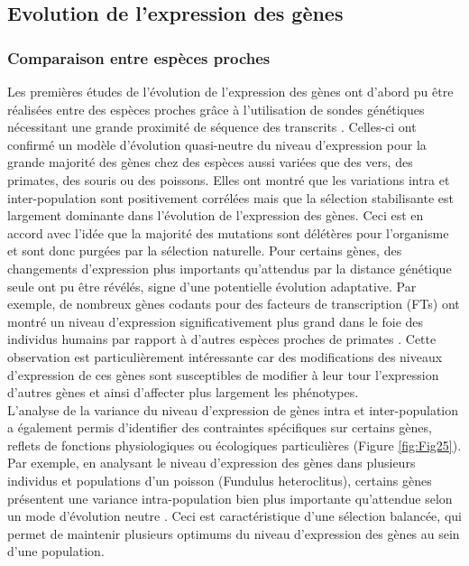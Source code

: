 \subsection{Evolution de l’expression des gènes}
\label{subsec:evol-expr}

\subsubsection{Comparaison entre espèces proches}
\label{subsec:comp-sp-proche}

Les premières études de l’évolution de l’expression des gènes ont d’abord pu être réalisées entre des espèces proches grâce à l’utilisation de sondes génétiques nécessitant une grande proximité de séquence des transcrits \citep{enard_intra-_2002,oleksiak_variation_2002,denver_transcriptional_2005,whitehead_neutral_2006, gilad_expression_2006}. Celles-ci ont confirmé un modèle d’évolution quasi-neutre du niveau d’expression pour la grande majorité des gènes chez des espèces aussi variées que des vers, des primates, des souris ou des poissons. Elles ont montré que les variations intra et inter-population sont positivement corrélées mais que la sélection stabilisante est largement dominante dans l’évolution de l’expression des gènes. Ceci est en accord avec l’idée que la majorité des mutations sont délétères pour l’organisme et sont donc purgées par la sélection naturelle. Pour certains gènes, des changements d’expression plus importants qu'attendus par la distance génétique seule ont pu être révélés, signe d’une potentielle évolution adaptative. Par exemple, de nombreux gènes codants pour des facteurs de transcription (\acrshort{FT}s) ont montré un niveau d’expression significativement plus grand dans le foie des individus humains par rapport à d’autres espèces proches de primates \citep{gilad_expression_2006}. Cette observation est particulièrement intéressante car des modifications des niveaux d’expression de ces gènes sont susceptibles de modifier à leur tour l’expression d’autres gènes et ainsi d’affecter plus largement les phénotypes. \\

L’analyse de la variance du niveau d’expression de gènes intra et inter-population a également permis d’identifier des contraintes spécifiques sur certains gènes, reflets de fonctions physiologiques ou écologiques particulières (Figure \ref{fig:Fig25}). Par exemple, en analysant le niveau d’expression des gènes dans plusieurs individus et populations d’un poisson (Fundulus heteroclitus), certains gènes présentent une variance intra-population bien plus importante qu’attendue selon un mode d’évolution neutre \citep{whitehead_neutral_2006}. Ceci est caractéristique d’une sélection balancée, qui permet de maintenir plusieurs optimums du niveau d’expression des gènes au sein d’une population. 

